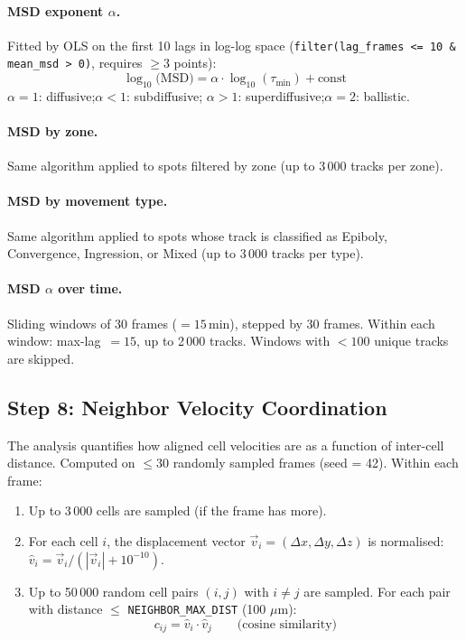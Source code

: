 \documentclass[11pt,a4paper]{article}
\newcommand{\um}{\,\mu\text{m}}
\newcommand{\param}[1]{\texttt{#1}}
\begin{document}
\paragraph{MSD exponent $\alpha$.}
Fitted by OLS on the first 10 lags in log-log space
(\texttt{filter(lag\_frames <= 10 \& mean\_msd > 0)}, requires $\ge 3$
points):
\[
  \log_{10}\!\bigl(\mathrm{MSD}\bigr) = \alpha\cdot\log_{10}(\tau_\mathrm{min})
  + \text{const}
\]
$\alpha = 1$: diffusive;\quad $\alpha < 1$: subdiffusive;\quad
$\alpha > 1$: superdiffusive;\quad $\alpha = 2$: ballistic.

\paragraph{MSD by zone.}  Same algorithm applied to spots filtered by
zone (up to 3\,000 tracks per zone).

\paragraph{MSD by movement type.}  Same algorithm applied to spots whose
track is classified as Epiboly, Convergence, Ingression, or Mixed
(up to 3\,000 tracks per type).

\paragraph{MSD $\alpha$ over time.}  Sliding windows of 30 frames
($= 15$\,min), stepped by 30 frames.  Within each window:
max-lag~$= 15$, up to 2\,000 tracks.  Windows with $< 100$ unique tracks
are skipped.

\subsection*{Step 8: Neighbor Velocity Coordination}
\label{sec:neighbors}

The analysis quantifies how aligned cell velocities are as a function of
inter-cell distance.  Computed on $\le 30$ randomly sampled frames (seed = 42).
Within each frame:

\begin{enumerate}[nosep]
  \item Up to 3\,000 cells are sampled (if the frame has more).
  \item For each cell $i$, the displacement vector $\vec{v}_i = (\Delta x,
    \Delta y, \Delta z)$ is normalised: $\hat v_i = \vec{v}_i / (|\vec{v}_i|
    + 10^{-10})$.
  \item Up to 50\,000 random cell pairs $(i,j)$ with $i\ne j$ are sampled.
    For each pair with distance $\le$ \param{NEIGHBOR\_MAX\_DIST} (100\,$\um$):
    \[
      c_{ij} = \hat v_i \cdot \hat v_j
      \qquad \text{(cosine similarity)}
    \]
\end{enumerate}
\end{document}
